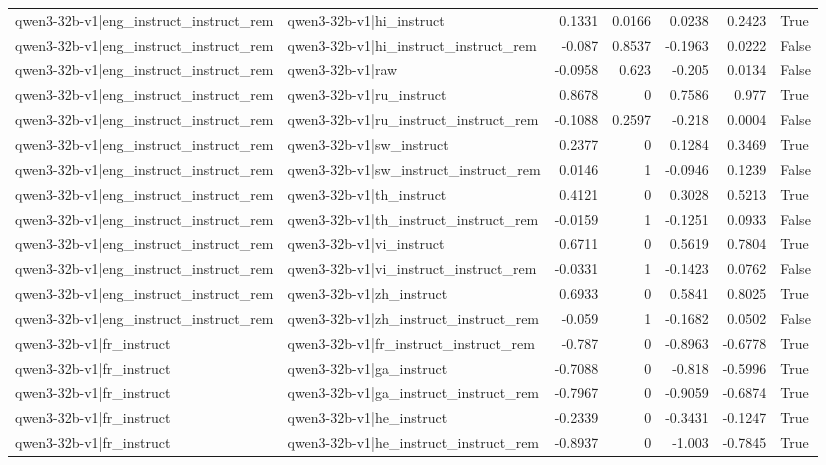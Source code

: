 \begin{table}
\begin{tabular}{l l r r r r l}
qwen3-32b-v1|eng_instruct_instruct_rem & qwen3-32b-v1|hi_instruct & 0.1331 & 0.0166 & 0.0238 & 0.2423 & True \\
qwen3-32b-v1|eng_instruct_instruct_rem & qwen3-32b-v1|hi_instruct_instruct_rem & -0.087 & 0.8537 & -0.1963 & 0.0222 & False \\
qwen3-32b-v1|eng_instruct_instruct_rem & qwen3-32b-v1|raw & -0.0958 & 0.623 & -0.205 & 0.0134 & False \\
qwen3-32b-v1|eng_instruct_instruct_rem & qwen3-32b-v1|ru_instruct & 0.8678 & 0 & 0.7586 & 0.977 & True \\
qwen3-32b-v1|eng_instruct_instruct_rem & qwen3-32b-v1|ru_instruct_instruct_rem & -0.1088 & 0.2597 & -0.218 & 0.0004 & False \\
qwen3-32b-v1|eng_instruct_instruct_rem & qwen3-32b-v1|sw_instruct & 0.2377 & 0 & 0.1284 & 0.3469 & True \\
qwen3-32b-v1|eng_instruct_instruct_rem & qwen3-32b-v1|sw_instruct_instruct_rem & 0.0146 & 1 & -0.0946 & 0.1239 & False \\
qwen3-32b-v1|eng_instruct_instruct_rem & qwen3-32b-v1|th_instruct & 0.4121 & 0 & 0.3028 & 0.5213 & True \\
qwen3-32b-v1|eng_instruct_instruct_rem & qwen3-32b-v1|th_instruct_instruct_rem & -0.0159 & 1 & -0.1251 & 0.0933 & False \\
qwen3-32b-v1|eng_instruct_instruct_rem & qwen3-32b-v1|vi_instruct & 0.6711 & 0 & 0.5619 & 0.7804 & True \\
qwen3-32b-v1|eng_instruct_instruct_rem & qwen3-32b-v1|vi_instruct_instruct_rem & -0.0331 & 1 & -0.1423 & 0.0762 & False \\
qwen3-32b-v1|eng_instruct_instruct_rem & qwen3-32b-v1|zh_instruct & 0.6933 & 0 & 0.5841 & 0.8025 & True \\
qwen3-32b-v1|eng_instruct_instruct_rem & qwen3-32b-v1|zh_instruct_instruct_rem & -0.059 & 1 & -0.1682 & 0.0502 & False \\
qwen3-32b-v1|fr_instruct & qwen3-32b-v1|fr_instruct_instruct_rem & -0.787 & 0 & -0.8963 & -0.6778 & True \\
qwen3-32b-v1|fr_instruct & qwen3-32b-v1|ga_instruct & -0.7088 & 0 & -0.818 & -0.5996 & True \\
qwen3-32b-v1|fr_instruct & qwen3-32b-v1|ga_instruct_instruct_rem & -0.7967 & 0 & -0.9059 & -0.6874 & True \\
qwen3-32b-v1|fr_instruct & qwen3-32b-v1|he_instruct & -0.2339 & 0 & -0.3431 & -0.1247 & True \\
qwen3-32b-v1|fr_instruct & qwen3-32b-v1|he_instruct_instruct_rem & -0.8937 & 0 & -1.003 & -0.7845 & True \\

\end{tabular}
\end{table}
